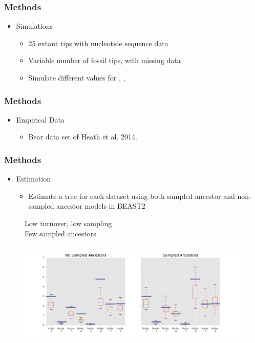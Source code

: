 \documentclass[]{beamer}
\begin{document}
\begin{frame}
\frametitle{Methods}
\begin{itemize}
\item Simulations
\begin{itemize}
\item 25 extant tips with nucleotide sequence data
\item Variable number of fossil tips, with missing data
\item Simulate different values for \lambda, \mu ,  \psi
\end{itemize}
\end{itemize}
\end{frame}

\begin{frame}
\frametitle{Methods}
\begin{itemize}
\item Empirical Data
\begin{itemize}
\item Bear data set of Heath et al. 2014.
\end{itemize}
\end{itemize}
\end{frame}

\begin{frame}
\frametitle{Methods}
\begin{itemize}
\item Estimation
\begin{itemize}
\item Estimate a tree for each dataset using both sampled ancestor and non-sampled ancestor models in BEAST2
\end{itemize}
\end{itemize}
\end{frame}

\begin{frame}
\begin{center}
\begin{figure}
Low turnover, low sampling  \\
Few sampled ancestors \\
\lambda   \mu   \psi   \rho \\
\includegraphics[scale=0.4]{images/LowTurnLowSampnodes.png}
\end{figure}
\end{center}
\end{frame}
\end{document}
